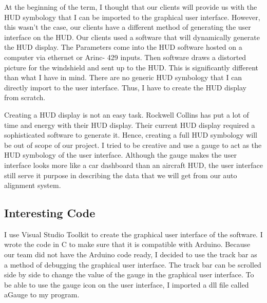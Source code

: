 At the beginning of the term, I thought that our clients will provide us with the HUD symbology that I can be imported to the graphical user interface. However, this wasn’t the case, our clients have a different method of generating the user interface on the HUD. Our clients used a software that will dynamically generate the HUD display. The Parameters come into the HUD software hosted on a computer via ethernet or Arinc- 429 inputs. Then software draws a distorted picture for the windshield and sent up to the HUD. This is significantly different than what I have in mind. There are no generic HUD symbology that I can directly import to the user interface. Thus, I have to create the HUD display from scratch. 

Creating a HUD display is not an easy task. Rockwell Collins has put a lot of time and energy with their HUD display. Their current HUD display required a sophisticated software to generate it. Hence, creating a full HUD symbology will be out of scope of our project. I tried to be creative and use a gauge to act as the HUD symbology of the user interface. Although the gauge makes the user interface looks more like a car dashboard than an aircraft HUD, the user interface still serve it purpose in describing the data that we will get from our auto alignment system. 

\subsection{Interesting Code}
I use Visual Studio Toolkit to create the graphical user interface of the software. I wrote the code in C to make sure that it is compatible with Arduino. Because our team did not have the Arduino code ready, I decided to use the track bar as a method of debugging the graphical user interface. The track bar can be scrolled side by side to change the value of the gauge in the graphical user interface. To be able to use the gauge icon on the user interface, I imported a dll file called aGauge to my program. 

